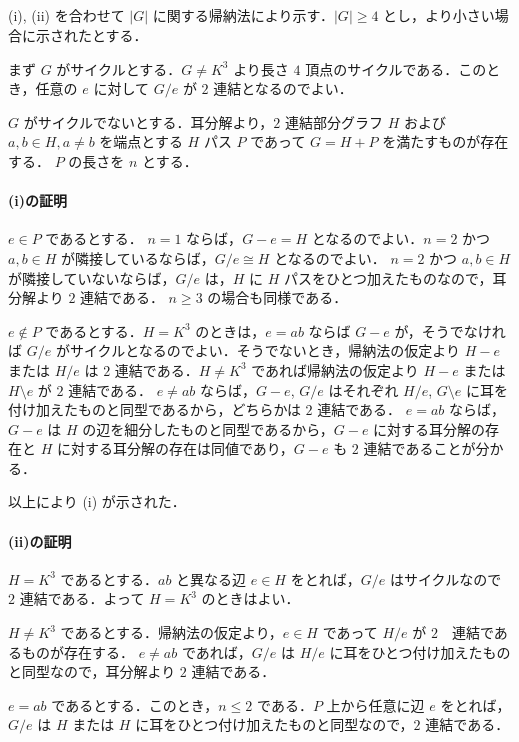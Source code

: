 \subsection{}
(i), (ii) を合わせて $|G|$ に関する帰納法により示す．$|G|\geq 4$ とし，より小さい場合に示されたとする．

まず $G$ がサイクルとする．$G\neq K^3$ より長さ $4$ 頂点のサイクルである．このとき，任意の $e$ に対して $G/e$ が $2$ 連結となるのでよい．
 
$G$ がサイクルでないとする．耳分解より，$2$ 連結部分グラフ $H$ および $a,b\in H, a\neq b$ を端点とする $H$ パス $P$ であって $G = H + P$ を満たすものが存在する．
$P$ の長さを $n$ とする．

\paragraph{(i)の証明}
$e\in P$ であるとする．
$n = 1$ ならば，$G-e=H$ となるのでよい．$n = 2$ かつ $a,b\in H$ が隣接しているならば，$G/e \cong H$ となるのでよい．
$n = 2$ かつ $a,b\in H$ が隣接していないならば，$G/e$ は，$H$ に $H$ パスをひとつ加えたものなので，耳分解より $2$ 連結である．
$n\geq 3$ の場合も同様である．

$e\notin P$ であるとする．$H = K^3$ のときは，$e = ab$ ならば $G - e$ が，そうでなければ $G / e$ がサイクルとなるのでよい．そうでないとき，帰納法の仮定より
$H-e$ または $H/e$ は $2$ 連結である．$H\neq K^3$ であれば帰納法の仮定より $H-e$ または $H\setminus e$ が $2$ 連結である．
$e\neq ab$ ならば，$G-e$, $G/e$ はそれぞれ $H/e$, $G\setminus e$ に耳を付け加えたものと同型であるから，どちらかは $2$ 連結である．
$e = ab$ ならば，$G - e$ は $H$ の辺を細分したものと同型であるから，$G-e$ に対する耳分解の存在と $H$ に対する耳分解の存在は同値であり，$G-e$ も $2$ 連結であることが分かる．

以上により (i) が示された．

\paragraph{(ii)の証明}
$H = K^3$ であるとする．$ab$ と異なる辺 $e\in H$ をとれば，$G/e$ はサイクルなので $2$ 連結である．よって $H=K^3$ のときはよい．

$H\neq K^3$ であるとする．帰納法の仮定より，$e\in H$ であって $H/e$ が $2$　連結であるものが存在する．
$e\neq ab$ であれば，$G/e$ は $H/e$ に耳をひとつ付け加えたものと同型なので，耳分解より $2$ 連結である．

$e = ab$ であるとする．このとき，$n\leq 2$ である．$P$ 上から任意に辺 $e$ をとれば，
$G/e$ は $H$ または $H$ に耳をひとつ付け加えたものと同型なので，$2$ 連結である．